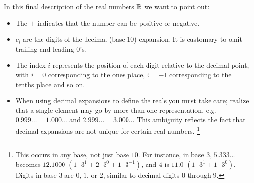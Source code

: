 \noindent In this final description of the real numbers ${\mathbb{ R}}$ we want to point out:
\begin{itemize}
    \item The \(\pm\) indicates that the number can be positive or negative.
    \item \(c_i\) are the digits of the decimal (base 10) expansion. It is customary to omit trailing and leading $0$'s.
    \item The index \(i\) represents the position of each digit relative to the decimal point, with \(i=0\) corresponding to the ones place, \(i=-1\) corresponding to the tenths place and so on.
    \item When using decimal expansions to define the reals you must take care; realize that a single element may go by more than one representation, e.g. $0.999 \ldots = 1.000 \ldots$ and $2.999 \ldots = 3.000 \ldots$ This ambiguity reflects the fact that decimal expansions are not unique for certain real numbers.
    \footnote{This occurs in any base, not just base $10$. For instance, in base $3$, $5.333\ldots$ becomes $12.1000$ $(1 \cdot 3^1 + 2 \cdot 3^0 + 1 \cdot 3^{-1})$, and $4$ is $11.0$ $(1 \cdot 3^1 + 1 \cdot 3^0)$. Digits in base $3$ are $0$, $1$, or $2$, similar to decimal digits $0$ through $9$. 
}
\end{itemize}
